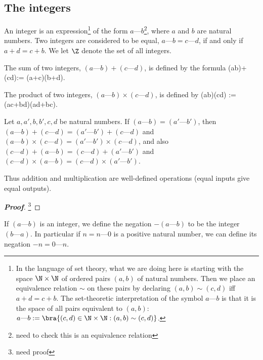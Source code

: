 \subsection{The integers}

\begin{definition}\label{def:integer}
An integer is an expression\footnote{In the language of set theory, what we are doing here is starting with the space $\N\times \N$ of ordered pairs $(a,b)$ of natural numbers. Then we place an equivalence relation $\sim$ on these pairs by declaring $(a,b) \sim (c,d)$ iff $a+d = c+b$. The set-theoretic interpretation of the symbol $a\text{---}b$ is that it is the space of all pairs equivalent to $(a,b)$: $a\text{---}b:=\bra{(c,d)\in \N\times\N:(a,b)\sim (c,d)}$.} of the form $a\text{---}b$\footnote{need to check this is an equivalence relation}, where $a$ and $b$ are natural numbers. Two integers are considered to be equal, $a\text{---}b = c\text{---}d$, if and only if $a+d = c+b$. We let $\Z$ denote the set of all integers.
\end{definition}

\begin{definition}
The sum of two integers, $(a\text{---}b)+(c\text{---}d)$, is defined by the formula
\be
(a\text{---}b)+ (c\text{---}d):= (a+c)\text{---}(b+d).
\ee

The product of two integers, $(a\text{---}b)\times (c\text{---}d)$, is defined by
\be
(a\text{---}b)\times (c\text{---}d) := (ac+bd)\text{---}(ad+bc).
\ee
\end{definition}

\begin{lemma}
Let $a,a',b,b',c,d$ be natural numbers. If $(a\text{---}b) = (a'\text{---}b')$, then $(a\text{---}b)+(c\text{---}d) = (a'\text{---}b')+(c\text{---}d)$ and $(a\text{---}b)\times (c\text{---}d) = (a'\text{---}b')\times (c\text{---}d)$, and also $(c\text{---}d)+(a\text{---}b) = (c\text{---}d)+ (a'\text{---}b')$ and $(c\text{---}d)\times (a\text{---}b) = (c\text{---}d)\times (a'\text{---}b')$.

Thus addition and multiplication are well-defined operations (equal inputs give equal outputs).
\end{lemma}

\begin{proof}[\bf Proof]
\footnote{need proof}
\end{proof}

\begin{definition}
If $(a\text{---}b)$ is an integer, we define the negation $-(a\text{---}b)$ to be the integer $(b\text{---}a)$. In particular if $n=n\text{---}0$ is a positive natural number, we can define its negation $-n = 0\text{---}n$.
\end{definition}

